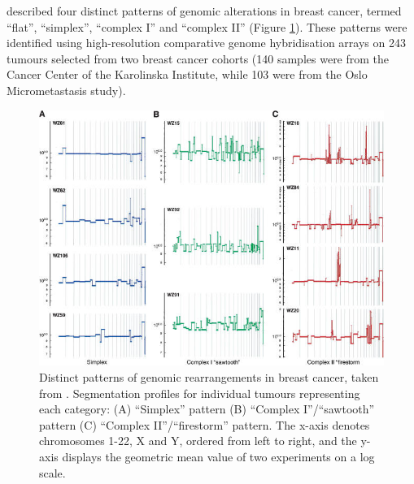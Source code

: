 \cite{pmid17142309} described four distinct patterns of genomic alterations in breast cancer, termed “flat”, “simplex”, “complex I” and “complex II” (Figure \ref{fig:fig.hicks}). These patterns were identified using high-resolution comparative genome hybridisation arrays on 243 tumours selected from two breast cancer cohorts (140 samples were from the Cancer Center of the Karolinska Institute, while 103 were from the Oslo Micrometastasis study).

\begin{figure}[!htt]
\includegraphics[width = 1\textwidth]{../figures/Chapter_2/Hicks_2006.jpg}
\caption[Distinct patterns of genomic rearrangements in breast cancer, taken from \cite{pmid17142309}.]{Distinct patterns of genomic rearrangements in breast cancer, taken from \cite{pmid17142309}. Segmentation profiles for individual tumours representing each category: (A) “Simplex” pattern (B) “Complex I”/“sawtooth” pattern (C) “Complex II”/“firestorm” pattern. The x-axis denotes chromosomes 1-22, X and Y, ordered from left to right, and the y-axis displays the geometric mean value of two experiments on a log scale.}
\label{fig:fig.hicks}
\end{figure}

